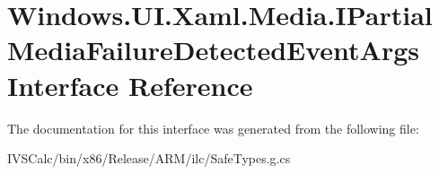 \hypertarget{interface_windows_1_1_u_i_1_1_xaml_1_1_media_1_1_i_partial_media_failure_detected_event_args}{}\section{Windows.\+U\+I.\+Xaml.\+Media.\+I\+Partial\+Media\+Failure\+Detected\+Event\+Args Interface Reference}
\label{interface_windows_1_1_u_i_1_1_xaml_1_1_media_1_1_i_partial_media_failure_detected_event_args}


The documentation for this interface was generated from the following file\+:\begin{DoxyCompactItemize}
\item 
I\+V\+S\+Calc/bin/x86/\+Release/\+A\+R\+M/ilc/Safe\+Types.\+g.\+cs\end{DoxyCompactItemize}
